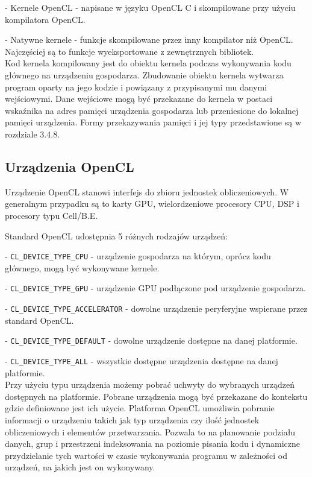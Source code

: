 - Kernele OpenCL - napisane w języku OpenCL C i skompilowane przy użyciu kompilatora OpenCL.

- Natywne kernele - funkcje skompilowane przez inny kompilator niż OpenCL. Najczęściej są to funkcje wyeksportowane z zewnętrznych bibliotek.\\

Kod kernela kompilowany jest do obiektu kernela podczas wykonywania kodu głównego na urządzeniu gospodarza. Zbudowanie obiektu kernela wytwarza program oparty na jego kodzie i powiązany z przypisanymi mu danymi wejściowymi. Dane wejściowe mogą być przekazane do kernela w postaci wskaźnika na adres pamięci urządzenia gospodarza lub przeniesione do lokalnej pamięci urządzenia. Formy przekazywania pamięci i jej typy przedstawione są w rozdziale 3.4.8.

\subsection{Urządzenia OpenCL}\label{sec:OpenC21L}

Urządzenie OpenCL stanowi interfejs do zbioru jednostek obliczeniowych. W generalnym przypadku są to karty GPU, wielordzeniowe procesory CPU, DSP i procesory typu Cell/B.E.

Standard OpenCL udostępnia 5 różnych rodzajów urządzeń:

- \verb|CL_DEVICE_TYPE_CPU| - urządzenie gospodarza na którym, oprócz kodu głównego, mogą być wykonywane kernele.

- \verb|CL_DEVICE_TYPE_GPU| - urządzenie GPU podłączone pod urządzenie gospodarza.

- \verb|CL_DEVICE_TYPE_ACCELERATOR| - dowolne urządzenie peryferyjne wspierane przez standard OpenCL.

- \verb|CL_DEVICE_TYPE_DEFAULT| - dowolne urządzenie dostępne na danej platformie.

- \verb|CL_DEVICE_TYPE_ALL| - wszystkie dostępne urządzenia dostępne na danej platformie.\\

Przy użyciu typu urządzenia możemy pobrać uchwyty do wybranych urządzeń dostępnych na platformie. Pobrane urządzenia mogą być przekazane do kontekstu gdzie definiowane jest ich użycie. Platforma OpenCL umożliwia pobranie informacji o urządzeniu takich jak typ urządzenia czy ilość jednostek obliczeniowych i elementów przetwarzania. Pozwala to na planowanie podziału danych, grup i przestrzeni indeksowania na poziomie pisania kodu i dynamiczne przydzielanie tych wartości w czasie wykonywania programu w zależności od urządzeń, na jakich jest on wykonywany.
 
